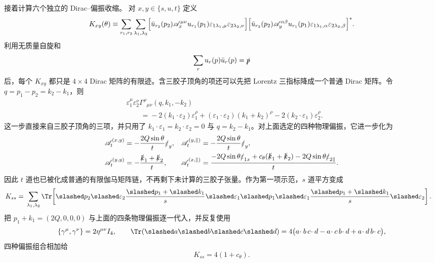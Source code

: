 \begin{derivation}
接着计算六个独立的 Dirac--偏振收缩。
对 $x,y\in\{s,u,t\}$ 定义
\begin{equation*}
 K_{xy}(\theta)
 \equiv
 \sum_{r_1,r_2}
 \sum_{\lambda_1,\lambda_2}
 \Bigl[
 \bar u_{r_2}(p_2)\mathscr A_x^{\mu\nu}u_{r_1}(p_1)
 \varepsilon_{1\lambda_1,\mu}
 \varepsilon_{2\lambda_2,\nu}
 \Bigr]
 \Bigl[
 \bar u_{r_2}(p_2)\mathscr A_y^{\alpha\beta}u_{r_1}(p_1)
 \varepsilon_{1\lambda_1,\alpha}
 \varepsilon_{2\lambda_2,\beta}
 \Bigr]^* .
\end{equation*}
利用无质量自旋和
\begin{equation*}
 \sum_r u_r(p)\bar u_r(p)=\slashed p
\end{equation*}
后，每个 $K_{xy}$ 都只是 $4\times4$ Dirac 矩阵的有限迹。含三胶子顶角的项还可以先把 Lorentz 三指标降成一个普通 Dirac 矩阵。令 $q=p_1-p_2=k_2-k_1$，则
\begin{align*}
 &\varepsilon_1^\mu\varepsilon_2^\nu
 \Gamma^{\rho}{}_{\mu\nu}(q,k_1,-k_2)\\
 &\qquad={}
 -2(k_1\!\cdot\varepsilon_2)\varepsilon_1^\rho
 +(\varepsilon_1\!\cdot\varepsilon_2)(k_1+k_2)^\rho
 -2(k_2\!\cdot\varepsilon_1)\varepsilon_2^\rho.
\end{align*}
这一步直接来自三胶子顶角的三项，并只用了
$k_1\cdot\varepsilon_1=k_2\cdot\varepsilon_2=0$ 与 $q=k_2-k_1$。对上面选定的四种物理偏振，它进一步化为
\begin{align*}
 \mathscr A_t^{(x,y)}
 &=-\frac{2Q\sin\theta}{t}\slashed\varepsilon_y,
 &
 \mathscr A_t^{(y,\parallel)}
 &=-\frac{2Q\sin\theta}{t}\slashed\varepsilon_y,\\
 \mathscr A_t^{(y,y)}
 &=-\frac{\slashed k_1+\slashed k_2}{t},
 &
 \mathscr A_t^{(x,\parallel)}
 &=\frac{-2Q\sin\theta\slashed\varepsilon_{1x}
 +c_\theta(\slashed k_1+\slashed k_2)
 -2Q\sin\theta\slashed\varepsilon_{2\parallel}}{t}.
\end{align*}
因此 $t$ 道也已被化成普通的有限伽马矩阵链，不再剩下未计算的三胶子张量。作为第一项示范，$s$ 道平方变成
\begin{align*}
 K_{ss}
 ={}&\sum_{\lambda_1,\lambda_2}
 \Tr\!\left[
 \slashed p_2
 \slashed\varepsilon_2
 \frac{\slashed p_1+\slashed k_1}{s}
 \slashed\varepsilon_1
 \slashed p_1
 \slashed\varepsilon_1
 \frac{\slashed p_1+\slashed k_1}{s}
 \slashed\varepsilon_2
 \right].
\end{align*}
把 $p_1+k_1=(2Q,0,0,0)$ 与上面的四条物理偏振逐一代入，并反复使用
\begin{equation*}
 \{\gamma^\mu,\gamma^\nu\}=2\eta^{\mu\nu}I_4,
 \qquad
 \Tr(\slashed a\slashed b\slashed c\slashed d)
 =4\bigl(a\!\cdot b\,c\!\cdot d-a\!\cdot c\,b\!\cdot d+a\!\cdot d\,b\!\cdot c\bigr),
\end{equation*}
四种偏振组合相加给
\begin{equation*}
 K_{ss}=4(1+c_\theta).
\end{equation*}


\end{derivation}
